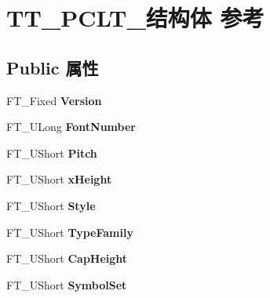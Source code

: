 \hypertarget{struct_t_t___p_c_l_t__}{}\section{T\+T\+\_\+\+P\+C\+L\+T\+\_\+结构体 参考}
\label{struct_t_t___p_c_l_t__}
\subsection*{Public 属性}
\begin{DoxyCompactItemize}
\item 
\mbox{\label{struct_t_t___p_c_l_t___a83429ca782a731b38d67e604809e278c}} 
F\+T\+\_\+\+Fixed {\bfseries Version}
\item 
\mbox{\label{struct_t_t___p_c_l_t___a1465aa1ea82df2be913eb64498fe3d94}} 
F\+T\+\_\+\+U\+Long {\bfseries Font\+Number}
\item 
\mbox{\label{struct_t_t___p_c_l_t___ae8134f929d7a259c081fe28e9b5cf53d}} 
F\+T\+\_\+\+U\+Short {\bfseries Pitch}
\item 
\mbox{\label{struct_t_t___p_c_l_t___a4b2f3e6bf6508eacbff5e4eb16745872}} 
F\+T\+\_\+\+U\+Short {\bfseries x\+Height}
\item 
\mbox{\label{struct_t_t___p_c_l_t___a8e99588c1d255e28aa3c59600d5ae7bd}} 
F\+T\+\_\+\+U\+Short {\bfseries Style}
\item 
\mbox{\label{struct_t_t___p_c_l_t___a9bb9ac1b782e03002ecb99de08af7935}} 
F\+T\+\_\+\+U\+Short {\bfseries Type\+Family}
\item 
\mbox{\label{struct_t_t___p_c_l_t___a754d840e5bcf6011459de635aa38d728}} 
F\+T\+\_\+\+U\+Short {\bfseries Cap\+Height}
\item 
\mbox{\label{struct_t_t___p_c_l_t___ad4eeb575ecd624d4540275981e96a336}} 
F\+T\+\_\+\+U\+Short {\bfseries Symbol\+Set}
\item 
\mbox{\label{struct_t_t___p_c_l_t___a47c2c6b276f3ab2002fe03af41dad396}} 

\end{DoxyCompactItemize}
